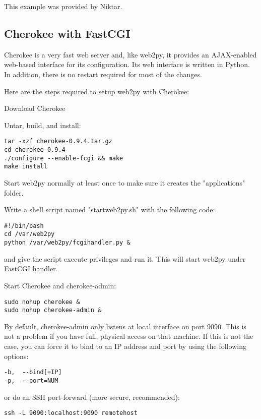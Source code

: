\documentclass[justified,sixbynine,notoc]{tufte-book}
\def\inxx#1{\index{#1}}
\begin{document}
\begin{fullwidth}
This example was provided by Niktar.

\goodbreak\subsection{Cherokee with FastCGI}

\inxx{Cherokee} \inxx{FastCGI}
Cherokee is a very fast web server and, like web2py, it provides an AJAX-enabled web-based interface for its configuration. Its web interface is written in Python. In addition, there is no restart required for most of the changes.

Here are the steps required to setup web2py with Cherokee:

Download Cherokee~\cite{cherokee}

Untar, build, and install:

\begin{lstlisting}
tar -xzf cherokee-0.9.4.tar.gz
cd cherokee-0.9.4
./configure --enable-fcgi && make
make install
\end{lstlisting}

Start web2py normally at least once to make sure it creates the "applications" folder.

Write a shell script named "startweb2py.sh" with the following code:

\begin{lstlisting}
#!/bin/bash
cd /var/web2py
python /var/web2py/fcgihandler.py &
\end{lstlisting}
\noindent and give the script execute privileges and run it.  This will start web2py under FastCGI handler.

Start Cherokee and cherokee-admin:

\begin{lstlisting}
sudo nohup cherokee &
sudo nohup cherokee-admin &
\end{lstlisting}

By default, cherokee-admin only listens at local interface on port 9090. This is not a problem if you have full, physical access on that machine. If this is not the case, you can force it to bind to an IP address and port by using the following options:
\begin{lstlisting}
-b,  --bind[=IP]
-p,  --port=NUM
\end{lstlisting}
\noindent or do an SSH port-forward (more secure, recommended):
\begin{lstlisting}
ssh -L 9090:localhost:9090 remotehost
\end{lstlisting}


\end{fullwidth}
\end{document}
